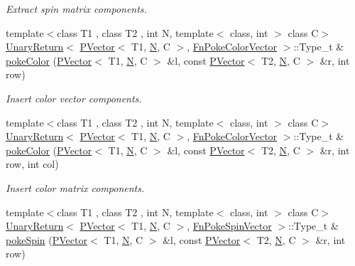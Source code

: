 \begin{DoxyCompactItemize}
\begin{DoxyCompactList}\small\item\em Extract spin matrix components. \end{DoxyCompactList}\item 
{\footnotesize template$<$class T1 , class T2 , int N, template$<$ class, int $>$ class C$>$ }\\\mbox{\hyperlink{structENSEM_1_1UnaryReturn}{Unary\+Return}}$<$ \mbox{\hyperlink{classENSEM_1_1PVector}{P\+Vector}}$<$ T1, \mbox{\hyperlink{operator__name__util_8cc_a7722c8ecbb62d99aee7ce68b1752f337}{N}}, C $>$, \mbox{\hyperlink{structENSEM_1_1FnPokeColorVector}{Fn\+Poke\+Color\+Vector}} $>$\+::Type\+\_\+t \& \mbox{\hyperlink{group__primvector_ga8643fc63839f4ef1bdbb168de2385c5e}{poke\+Color}} (\mbox{\hyperlink{classENSEM_1_1PVector}{P\+Vector}}$<$ T1, \mbox{\hyperlink{operator__name__util_8cc_a7722c8ecbb62d99aee7ce68b1752f337}{N}}, C $>$ \&l, const \mbox{\hyperlink{classENSEM_1_1PVector}{P\+Vector}}$<$ T2, \mbox{\hyperlink{operator__name__util_8cc_a7722c8ecbb62d99aee7ce68b1752f337}{N}}, C $>$ \&r, int row)
\begin{DoxyCompactList}\small\item\em Insert color vector components. \end{DoxyCompactList}\item 
{\footnotesize template$<$class T1 , class T2 , int N, template$<$ class, int $>$ class C$>$ }\\\mbox{\hyperlink{structENSEM_1_1UnaryReturn}{Unary\+Return}}$<$ \mbox{\hyperlink{classENSEM_1_1PVector}{P\+Vector}}$<$ T1, \mbox{\hyperlink{operator__name__util_8cc_a7722c8ecbb62d99aee7ce68b1752f337}{N}}, C $>$, \mbox{\hyperlink{structENSEM_1_1FnPokeColorVector}{Fn\+Poke\+Color\+Vector}} $>$\+::Type\+\_\+t \& \mbox{\hyperlink{group__primvector_ga756245fd2f8bde2eab2ef42e08578af6}{poke\+Color}} (\mbox{\hyperlink{classENSEM_1_1PVector}{P\+Vector}}$<$ T1, \mbox{\hyperlink{operator__name__util_8cc_a7722c8ecbb62d99aee7ce68b1752f337}{N}}, C $>$ \&l, const \mbox{\hyperlink{classENSEM_1_1PVector}{P\+Vector}}$<$ T2, \mbox{\hyperlink{operator__name__util_8cc_a7722c8ecbb62d99aee7ce68b1752f337}{N}}, C $>$ \&r, int row, int col)
\begin{DoxyCompactList}\small\item\em Insert color matrix components. \end{DoxyCompactList}\item 
{\footnotesize template$<$class T1 , class T2 , int N, template$<$ class, int $>$ class C$>$ }\\\mbox{\hyperlink{structENSEM_1_1UnaryReturn}{Unary\+Return}}$<$ \mbox{\hyperlink{classENSEM_1_1PVector}{P\+Vector}}$<$ T1, \mbox{\hyperlink{operator__name__util_8cc_a7722c8ecbb62d99aee7ce68b1752f337}{N}}, C $>$, \mbox{\hyperlink{structENSEM_1_1FnPokeSpinVector}{Fn\+Poke\+Spin\+Vector}} $>$\+::Type\+\_\+t \& \mbox{\hyperlink{group__primvector_ga10934b73afbfb3796cad8a1208d7ab1d}{poke\+Spin}} (\mbox{\hyperlink{classENSEM_1_1PVector}{P\+Vector}}$<$ T1, \mbox{\hyperlink{operator__name__util_8cc_a7722c8ecbb62d99aee7ce68b1752f337}{N}}, C $>$ \&l, const \mbox{\hyperlink{classENSEM_1_1PVector}{P\+Vector}}$<$ T2, \mbox{\hyperlink{operator__name__util_8cc_a7722c8ecbb62d99aee7ce68b1752f337}{N}}, C $>$ \&r, int row)

\end{DoxyCompactItemize}
